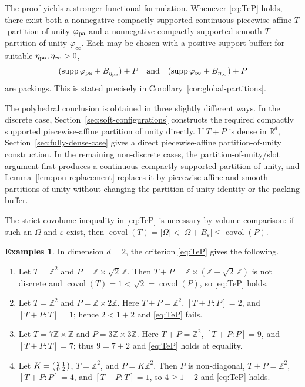 \documentclass[11pt,reqno]{amsart}
\numberwithin{equation}{section}
\theoremstyle{definition}
\newtheorem{examples}[theorem]{Examples}
\theoremstyle{remark}
\newcommand{\R}{\mathbb R}
\newcommand{\Z}{\mathbb Z}
\newcommand{\eps}{\varepsilon}
\newcommand{\covol}{\operatorname{covol}}
\newcommand{\supp}{\operatorname{supp}}
\begin{document}
The proof yields a stronger functional formulation.  Whenever
\eqref{eq:TeP} holds, there exist both a nonnegative compactly supported
continuous piecewise-affine $T$-partition of unity $\varphi_{\rm pa}$ and a
nonnegative compactly supported smooth $T$-partition of unity
$\varphi_{\infty}$.  Each may be chosen with a positive support buffer:
for suitable $\eta_{\rm pa},\eta_{\infty}>0$,
\[
 (\supp\varphi_{\rm pa}+B_{\eta_{\rm pa}})+P
 \quad\text{and}\quad
 (\supp\varphi_{\infty}+B_{\eta_{\infty}})+P
\]
are packings.  This is stated precisely in
Corollary~\ref{cor:global-partitions}.

The polyhedral conclusion is obtained in three slightly different ways.  In
the discrete case, Section~\ref{sec:soft-configurations} constructs the required compactly supported
piecewise-affine partition of unity directly.  If $T+P$ is dense in
$\R^d$, Section~\ref{sec:fully-dense-case} gives a direct piecewise-affine
partition-of-unity construction.  In the remaining non-discrete cases, the partition-of-unity/slot
argument first produces a continuous compactly supported partition of unity,
and Lemma~\ref{lem:pou-replacement} replaces it by piecewise-affine and
smooth partitions of unity without changing the partition-of-unity identity
or the packing buffer.

The strict covolume inequality in \eqref{eq:TeP} is necessary by volume
comparison: if such an $\Omega$ and $\eps$ exist, then
$\covol(T)=|\Omega|<|\Omega+B_\eps|\le\covol(P)$.

\begin{examples}\label{ex:intro-TeP}
In dimension $d=2$, the criterion \eqref{eq:TeP} gives the following.
\begin{enumerate}[label=(\roman*)]
\item Let $T=\Z^2$ and $P=\Z\times\sqrt2\,\Z$.  Then
$T+P=\Z\times(\Z+\sqrt2\,\Z)$ is not discrete and
$\covol(T)=1<\sqrt2=\covol(P)$, so \eqref{eq:TeP} holds.

\item Let $T=\Z^2$ and $P=\Z\times2\Z$.  Here
$T+P=\Z^2$, $[T+P:P]=2$, and $[T+P:T]=1$; hence
$2<1+2$ and \eqref{eq:TeP} fails.

\item Let $T=7\Z\times\Z$ and $P=3\Z\times3\Z$.  Here
$T+P=\Z^2$, $[T+P:P]=9$, and $[T+P:T]=7$; thus
$9=7+2$ and \eqref{eq:TeP} holds at equality.

\item Let $K=\begin{psmallmatrix}2&1\\0&2\end{psmallmatrix}$,
$T=\Z^2$, and $P=K\Z^2$.  Then $P$ is non-diagonal,
$T+P=\Z^2$, $[T+P:P]=4$, and $[T+P:T]=1$, so
$4\ge1+2$ and \eqref{eq:TeP} holds.
\end{enumerate}
\end{examples}
\end{document}
